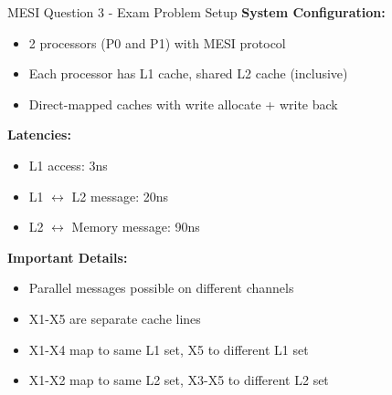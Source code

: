 \documentclass[aspectratio=169,12pt]{beamer}
\begin{document}
\begin{frame}{MESI Question 3 - Exam Problem Setup}
\footnotesize
\textbf{System Configuration:}
\begin{itemize}
\item 2 processors (P0 and P1) with MESI protocol
\item Each processor has L1 cache, shared L2 cache (inclusive)
\item Direct-mapped caches with write allocate + write back
\end{itemize}

\textbf{Latencies:}
\begin{itemize}
\item L1 access: 3ns
\item L1 $\leftrightarrow$ L2 message: 20ns
\item L2 $\leftrightarrow$ Memory message: 90ns
\end{itemize}

\textbf{Important Details:}
\begin{itemize}
\item Parallel messages possible on different channels
\item X1-X5 are separate cache lines
\item X1-X4 map to same L1 set, X5 to different L1 set
\item X1-X2 map to same L2 set, X3-X5 to different L2 set
\end{itemize}
\end{frame}
\end{document}

